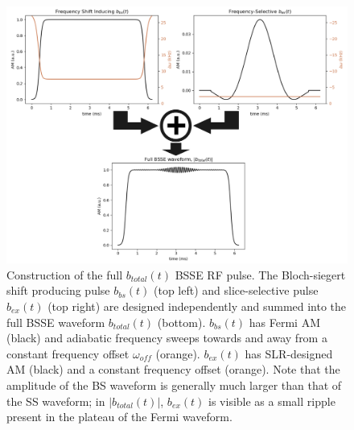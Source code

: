 \begin{figure}[h]
\centering
\includegraphics[width=1.1\textwidth]{figures/pulse_construction.png}
\caption{Construction of the full $b_{total}(t)$ BSSE RF pulse. The Bloch-siegert shift producing pulse $b_{bs}(t)$ (top left) and slice-selective pulse $b_{ex}(t)$ (top right) are designed independently and summed into the full BSSE waveform $b_{total}(t)$ (bottom). $b_{bs}(t)$ has Fermi AM (black) and adiabatic frequency sweeps towards and away from a constant frequency offset $\omega_{off}$ (orange). $b_{ex}(t)$ has SLR-designed AM (black) and a constant frequency offset (orange). 
Note that the amplitude of the BS waveform is generally much larger than that of the SS waveform; in $|b_{total}(t)|$, $b_{ex}(t)$ is visible as a small ripple present in the plateau of the Fermi waveform.}
\label{fig:alg}
\end{figure}

